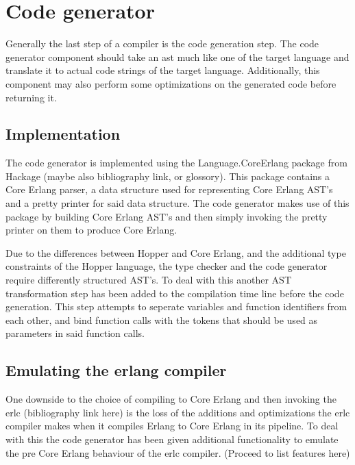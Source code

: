 \section{Code generator}

Generally the last step of a compiler is the code generation step. The code generator
component should take an \acrshort{ast} much like one of the target language and translate it
to actual code strings of the target language. Additionally, this component may also
perform some optimizations on the generated code before returning it.

\subsection{Implementation}

The code generator is implemented using the Language.CoreErlang \cite{CoreErlang} package
from Hackage (maybe also bibliography link, or glossory). This package contains a Core Erlang
parser, a data structure used for representing Core Erlang AST's and a pretty printer for
said data structure. The code generator makes use of this package by building Core Erlang
AST's and then simply invoking the pretty printer on them to  produce Core Erlang.

Due to the differences between Hopper and Core Erlang, and the additional type constraints
of the Hopper language, the type checker and the code generator require differently
structured AST's. To deal with this another AST transformation step has been added to the
compilation time line before the code generation. This step attempts to seperate variables
and function identifiers from each other, and bind function calls with the tokens that
should be used as parameters in said function calls.

\subsection{Emulating the erlang compiler}

One downside to the choice of compiling to Core Erlang and then invoking the erlc
(bibliography link here) is the loss of the additions and optimizations the erlc
compiler makes when it compiles Erlang to Core Erlang in its pipeline. To deal with this
the code generator has been given additional functionality to emulate the pre Core Erlang
behaviour of the erlc compiler. (Proceed to list features here)
